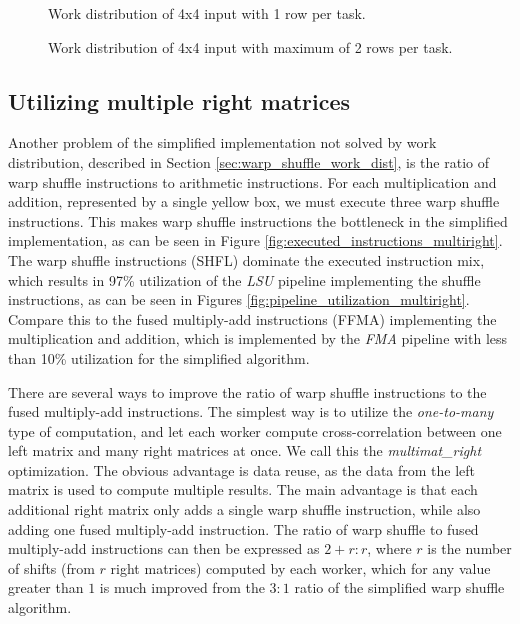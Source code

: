 \begin{figure}[ht]
	\centering
	\def\svgwidth{\textwidth}
	
	\caption{Work distribution of 4x4 input with 1 row per task.}
	\label{fig:work_dist_max_1}
\end{figure}


\begin{figure}[ht]
	\centering
	\def\svgwidth{\textwidth}
	
	\caption{Work distribution of 4x4 input with maximum of 2 rows per task.}
	\label{fig:work_dist_max_2}
\end{figure}


\subsection{Utilizing multiple right matrices}
\label{sec:multimat_right}

Another problem of the simplified implementation not solved by work distribution, described in Section \ref{sec:warp_shuffle_work_dist}, is the ratio of warp shuffle instructions to arithmetic instructions. For each multiplication and addition, represented by a single yellow box, we must execute three warp shuffle instructions. This makes warp shuffle instructions the bottleneck in the simplified implementation, as can be seen in Figure \ref{fig:executed_instructions_multiright}. The warp shuffle instructions (SHFL) dominate the executed instruction mix, which results in 97\% utilization of the \textit{LSU} pipeline implementing the shuffle instructions, as can be seen in Figures \ref{fig:pipeline_utilization_multiright}. Compare this to the fused multiply-add instructions (FFMA) implementing the multiplication and addition, which is implemented by the \textit{FMA} pipeline with less than 10\% utilization for the simplified algorithm.


There are several ways to improve the ratio of warp shuffle instructions to the fused multiply-add instructions. The simplest way is to utilize the \textit{one-to-many} type of computation, and let each worker compute cross-correlation between one left matrix and many right matrices at once. We call this the \textit{multimat\_right} optimization. The obvious advantage is data reuse, as the data from the left matrix is used to compute multiple results. The main advantage is that each additional right matrix only adds a single warp shuffle instruction, while also adding one fused multiply-add instruction. The ratio of warp shuffle to fused multiply-add instructions can then be expressed as $2 + r : r$, where $r$ is the number of shifts (from $r$ right matrices) computed by each worker, which for any value greater than $1$ is much improved from the $3:1$ ratio of the simplified warp shuffle algorithm.

